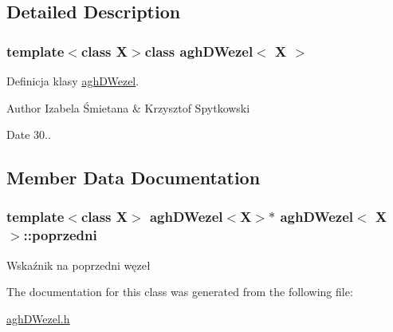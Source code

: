 \subsection{\-Detailed \-Description}
\subsubsection*{template$<$class \-X$>$class agh\-D\-Wezel$<$ X $>$}

\-Definicja klasy \hyperlink{classaghDWezel}{agh\-D\-Wezel}. 

\begin{DoxyAuthor}{\-Author}
\-Izabela Śmietana \& \-Krzysztof \-Spytkowski 
\end{DoxyAuthor}
\begin{DoxyDate}{\-Date}
30.. 
\end{DoxyDate}


\subsection{\-Member \-Data \-Documentation}
\hypertarget{classaghDWezel_ada1ab89feb17b0bf66727b673f6d3aac}{
\subsubsection[{poprzedni}]{\setlength{\rightskip}{0pt plus 5cm}template$<$class \-X$>$ {\bf agh\-D\-Wezel}$<$\-X$>$$\ast$ {\bf agh\-D\-Wezel}$<$ \-X $>$\-::{\bf poprzedni}}}\label{classaghDWezel_ada1ab89feb17b0bf66727b673f6d3aac}
\-Wskaźnik na poprzedni węzeł 

\-The documentation for this class was generated from the following file\-:\begin{DoxyCompactItemize}
\item 
\hyperlink{aghDWezel_8h}{agh\-D\-Wezel.\-h}\end{DoxyCompactItemize}
